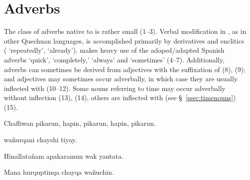\section{Adverbs}\label{sec:adverbs}
The class of adverbs native to \SYQ{} is rather small (1--3). Verbal modification in \SYQ{}, as in other Quechuan languages, is accomplished primarily by derivatives and enclitics ( `repeatedly',  `already'). \SYQ{} makes heavy use of the adoped/adapted Spanish adverbs  `quick',  `completely,'  `always' and  `sometimes' (4--7). Additionally, adverbs can sometimes be derived from adjectives with the suffixation of  (8), (9); and adjectives may sometimes occur adverbally, in which case they are usually inflected with  (10--12). Some nouns referring to time may occur adverbally without inflection (13), (14), others are inflected with  (see \S~\ref{ssec:timenouns}) (15).

%
{Chafliwan pikarun,  hapin,  pikarun,  hapin,  pikarun.}%
{}%
{}{}%

%
{ wa\~nurqani chayshi tiyay.}%
{}%
{}{}%

%
{Hinallata\~nam  apakaramun wak yantata.}%
{}%
{}{}%

%
{Mana  hurquptinqa chayqa wa\~nuchin.}%
{}%
{}{}%

